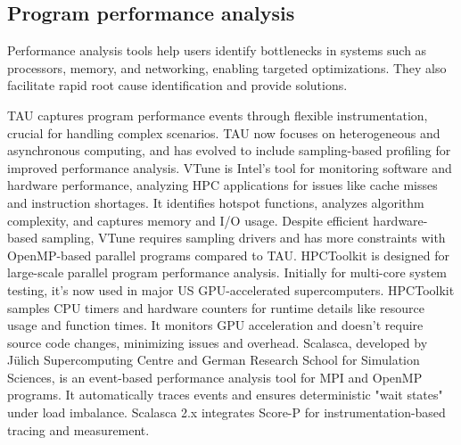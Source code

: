 \documentclass[lineno,sn-mathphys]{sn-jnl}%
\theoremstyle{thmstyleone}%
\theoremstyle{thmstyletwo}%
\theoremstyle{thmstylethree}%
\begin{document}
 \subsection{Program performance analysis}
 Performance analysis tools help users identify bottlenecks in systems such as processors, memory, and networking, enabling targeted optimizations. They also facilitate rapid root cause identification and provide solutions.\par
 TAU captures program performance events through flexible instrumentation, crucial for handling complex scenarios. TAU now focuses on heterogeneous and asynchronous computing, and has evolved to include sampling-based profiling for improved performance analysis.
 VTune is Intel's tool for monitoring software and hardware performance, analyzing HPC applications for issues like cache misses and instruction shortages. It identifies hotspot functions, analyzes algorithm complexity, and captures memory and I/O usage. Despite efficient hardware-based sampling, VTune requires sampling drivers and has more constraints with OpenMP-based parallel programs compared to TAU.
 HPCToolkit is designed for large-scale parallel program performance analysis. Initially for multi-core system testing, it's now used in major US GPU-accelerated supercomputers. HPCToolkit samples CPU timers and hardware counters for runtime details like resource usage and function times. It monitors GPU acceleration and doesn't require source code changes, minimizing issues and overhead.
 Scalasca, developed by Jülich Supercomputing Centre and German Research School for Simulation Sciences, is an event-based performance analysis tool for MPI and OpenMP programs. It automatically traces events and ensures deterministic "wait states" under load imbalance. Scalasca 2.x integrates Score-P for instrumentation-based tracing and measurement.
\end{document}
